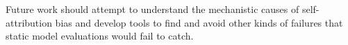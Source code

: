 Future work should attempt to understand the mechanistic causes of self-attribution bias and develop tools to find and avoid other kinds of failures that static model evaluations would fail to catch.





\vspace{-1mm}
